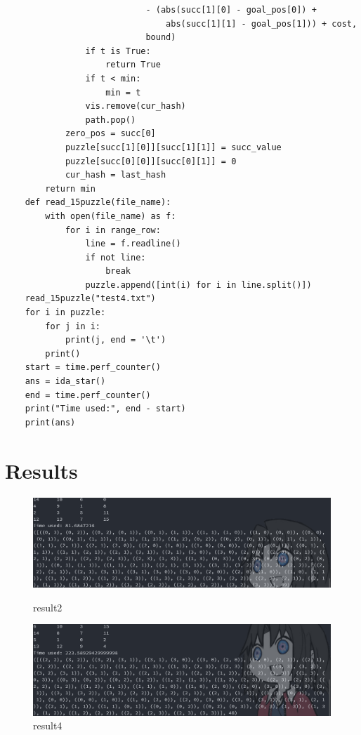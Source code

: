 \documentclass[a4paper, 11pt]{article}
\begin{document}
\begin{lstlisting}
							- (abs(succ[1][0] - goal_pos[0]) +
								abs(succ[1][1] - goal_pos[1])) + cost,
							bound)
				if t is True:
					return True
				if t < min:
					min = t
				vis.remove(cur_hash)
				path.pop()
			zero_pos = succ[0]
			puzzle[succ[1][0]][succ[1][1]] = succ_value
			puzzle[succ[0][0]][succ[0][1]] = 0
			cur_hash = last_hash
		return min
	def read_15puzzle(file_name):
		with open(file_name) as f:
			for i in range_row:
				line = f.readline()
				if not line:
					break
				puzzle.append([int(i) for i in line.split()])
	read_15puzzle("test4.txt")
	for i in puzzle:
		for j in i:
			print(j, end = '\t')
		print()
	start = time.perf_counter()
	ans = ida_star()
	end = time.perf_counter()
	print("Time used:", end - start)
	print(ans)
\end{lstlisting}
\section{Results}
\begin{figure}[ht]
	\centering
	\includegraphics[width=12cm]{result2.png}
	\caption{result2}
	\includegraphics[width=12cm]{result4.png}
	\caption{result4}
\end{figure}

%
%
\end{document}
